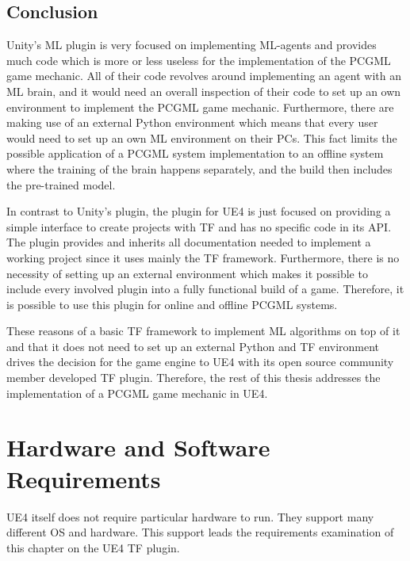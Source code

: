 \documentclass[MGS,Master,english]{twbook}%
\begin{document}
\subsection{Conclusion}
Unity’s ML plugin is very focused on implementing ML-agents and provides much code which is more or less useless for the implementation of the PCGML game mechanic. All of their code revolves around implementing an agent with an ML brain, and it would need an overall inspection of their code to set up an own environment to implement the PCGML game mechanic. Furthermore, there are making use of an external Python environment which means that every user would need to set up an own ML environment on their PCs. This fact limits the possible application of a PCGML system implementation to an offline system where the training of the brain happens separately, and the build then includes the pre-trained model.

In contrast to Unity’s plugin, the plugin for UE4 is just focused on providing a simple interface to create projects with \ac{TF} and has no specific code in its API. The plugin provides and inherits all documentation needed to implement a working project since it uses mainly the \ac{TF} framework. Furthermore, there is no necessity of setting up an external environment which makes it possible to include every involved plugin into a fully functional build of a game. Therefore, it is possible to use this plugin for online and offline PCGML systems.

These reasons of a basic \ac{TF} framework to implement ML algorithms on top of it and that it does not need to set up an external Python and \ac{TF} environment drives the decision for the game engine to UE4 with its open source community member developed \ac{TF} plugin. Therefore, the rest of this thesis addresses the implementation of a PCGML game mechanic in UE4.

\section{Hardware and Software Requirements}
UE4 itself does not require particular hardware to run. They support many different OS and hardware. This support leads the requirements examination of this chapter on the UE4 \ac{TF} plugin.
\end{document}
